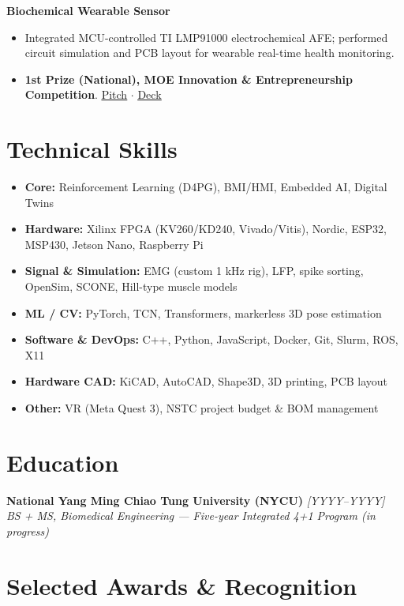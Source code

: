 \documentclass[10pt,a4paper]{article}
\newcommand{\link}[2]{\href{#1}{\underline{#2}}}
\begin{document}
\textbf{Biochemical Wearable Sensor}
\begin{itemize}
    \item Integrated MCU-controlled TI LMP91000 electrochemical AFE; performed
    circuit simulation and PCB layout for wearable real-time health monitoring.
    \item \textbf{1st Prize (National), MOE Innovation \& Entrepreneurship Competition}.
    \link{https://YOUR-PITCH}{Pitch} $\cdot$
    \link{https://YOUR-DECK}{Deck}
\end{itemize}

\section*{Technical Skills}

\begin{itemize}[leftmargin=1.2em]
    \item[] \textbf{Core:} Reinforcement Learning (D4PG), BMI/HMI, Embedded AI, Digital Twins
    \item[] \textbf{Hardware:} Xilinx FPGA (KV260/KD240, Vivado/Vitis), Nordic, ESP32, MSP430, Jetson Nano, Raspberry Pi
    \item[] \textbf{Signal \& Simulation:} EMG (custom 1 kHz rig), LFP, spike sorting, OpenSim, SCONE, Hill-type muscle models
    \item[] \textbf{ML / CV:} PyTorch, TCN, Transformers, markerless 3D pose estimation
    \item[] \textbf{Software \& DevOps:} C++, Python, JavaScript, Docker, Git, Slurm, ROS, X11
    \item[] \textbf{Hardware CAD:} KiCAD, AutoCAD, Shape3D, 3D printing, PCB layout
    \item[] \textbf{Other:} VR (Meta Quest 3), NSTC project budget \& BOM management
\end{itemize}

\section*{Education}

\textbf{National Yang Ming Chiao Tung University (NYCU)} \hfill \textit{[YYYY--YYYY]}\\
\textit{BS + MS, Biomedical Engineering — Five-year Integrated 4+1 Program (in progress)}

\section*{Selected Awards \& Recognition}
\end{document}
